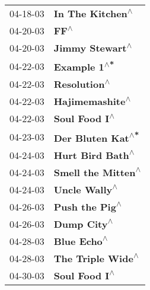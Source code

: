 \begin{supertabular}{p{0.25\columnwidth}p{0.75\columnwidth}}
 04-18-03 &                                                           \textbf{In The Kitchen\textsuperscript{$\wedge$}} \\
 04-20-03 &                                                                       \textbf{FF\textsuperscript{$\wedge$}} \\
 04-20-03 &                                                            \textbf{Jimmy Stewart\textsuperscript{$\wedge$}} \\
 04-22-03 &                                                               \textbf{Example 1\textsuperscript{$\wedge$*}} \\
 04-22-03 &                                                               \textbf{Resolution\textsuperscript{$\wedge$}} \\
 04-22-03 &                                                            \textbf{Hajimemashite\textsuperscript{$\wedge$}} \\
 04-22-03 &                                                              \textbf{Soul Food I\textsuperscript{$\wedge$}} \\
 04-23-03 &                                                          \textbf{Der Bluten Kat\textsuperscript{$\wedge$*}} \\
 04-24-03 &                                                           \textbf{Hurt Bird Bath\textsuperscript{$\wedge$}} \\
 04-24-03 &                                                         \textbf{Smell the Mitten\textsuperscript{$\wedge$}} \\
 04-24-03 &                                                              \textbf{Uncle Wally\textsuperscript{$\wedge$}} \\
 04-26-03 &                                                             \textbf{Push the Pig\textsuperscript{$\wedge$}} \\
 04-26-03 &                                                                \textbf{Dump City\textsuperscript{$\wedge$}} \\
 04-28-03 &                                                                \textbf{Blue Echo\textsuperscript{$\wedge$}} \\
 04-28-03 &                                                          \textbf{The Triple Wide\textsuperscript{$\wedge$}} \\
 04-30-03 &                                                              \textbf{Soul Food I\textsuperscript{$\wedge$}} \\

\end{supertabular}
